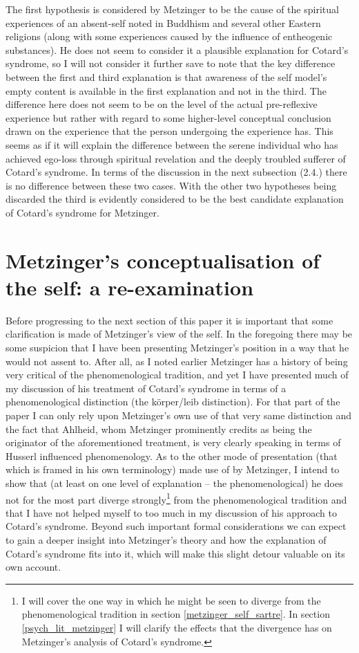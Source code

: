The first hypothesis is considered by Metzinger to be the cause of the spiritual experiences of an absent-self noted in Buddhism and several other Eastern religions (along with some experiences caused by the influence of entheogenic substances). He does not seem to consider it a plausible explanation for Cotard's syndrome, so I will not consider it further save to note that the key difference between the first and third explanation is that awareness of the self model's empty content is available in the first explanation and not in the third. The difference here does not seem to be on the level of the actual pre-reflexive experience but rather with regard to some higher-level conceptual conclusion drawn on the experience that the person undergoing the experience has. This seems as if it will explain the difference between the serene individual who has achieved ego-loss through spiritual revelation and the deeply troubled sufferer of Cotard's syndrome. In terms of the discussion in the next subsection (2.4.) there is no difference between these two cases.
With the other two hypotheses being discarded the third is evidently considered to be the best candidate explanation of Cotard's syndrome for Metzinger.

\section{Metzinger's conceptualisation of the self: a re-examination}
\label{metzinger_self}

Before progressing to the next section of this paper it is important that some clarification is made of Metzinger's view of the self. In the foregoing there may be some suspicion that I have been presenting Metzinger's position in a way that he would not assent to. After all, as I noted earlier Metzinger has a history of being very critical of the phenomenological tradition, and yet I have presented much of my discussion of his treatment of Cotard's syndrome in terms of a phenomenological distinction (the k\"{o}rper/leib distinction). For that part of the paper I can only rely upon Metzinger's own use of that very same distinction and the fact that Ahlheid, whom Metzinger prominently credits as being the originator of the aforementioned treatment, is very clearly speaking in terms of Husserl influenced phenomenology. As to the other mode of presentation (that which is framed in his own terminology) made use of by Metzinger, I intend to show that (at least on one level of explanation – the phenomenological) he does not for the most part diverge strongly\footnote{I will cover the one way in which he might be seen to diverge from the phenomenological tradition in section \ref{metzinger_self_sartre}. In section \ref{psych_lit_metzinger} I will clarify the effects that the divergence has on Metzinger's analysis of Cotard's syndrome.} from the phenomenological tradition and that I have not helped myself to too much in my discussion of his approach to Cotard's syndrome. Beyond such important formal considerations we can expect to gain a deeper insight into Metzinger's theory and how the explanation of Cotard's syndrome fits into it, which will make this slight detour valuable on its own account.

